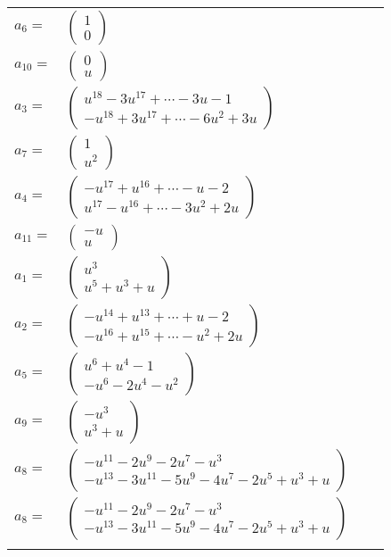 \documentclass[1p]{elsarticle_modified}
\theoremstyle{definition}
\begin{document}
\begin{tabular}{m{7pt} m{180pt} m{7pt} m{180pt} }
\flushright $a_{6}=$&$\begin{pmatrix}1\\0\end{pmatrix}$ \\
\flushright $a_{10}=$&$\begin{pmatrix}0\\u\end{pmatrix}$ \\
\flushright $a_{3}=$&$\begin{pmatrix}u^{18}-3 u^{17}+\cdots-3 u-1\\- u^{18}+3 u^{17}+\cdots-6 u^2+3 u\end{pmatrix}$ \\
\flushright $a_{7}=$&$\begin{pmatrix}1\\u^2\end{pmatrix}$ \\
\flushright $a_{4}=$&$\begin{pmatrix}- u^{17}+u^{16}+\cdots- u-2\\u^{17}- u^{16}+\cdots-3 u^2+2 u\end{pmatrix}$ \\
\flushright $a_{11}=$&$\begin{pmatrix}- u\\u\end{pmatrix}$ \\
\flushright $a_{1}=$&$\begin{pmatrix}u^3\\u^5+u^3+u\end{pmatrix}$ \\
\flushright $a_{2}=$&$\begin{pmatrix}- u^{14}+u^{13}+\cdots+u-2\\- u^{16}+u^{15}+\cdots- u^2+2 u\end{pmatrix}$ \\
\flushright $a_{5}=$&$\begin{pmatrix}u^6+u^4-1\\- u^6-2 u^4- u^2\end{pmatrix}$ \\
\flushright $a_{9}=$&$\begin{pmatrix}- u^3\\u^3+u\end{pmatrix}$ \\
\flushright $a_{8}=$&$\begin{pmatrix}- u^{11}-2 u^9-2 u^7- u^3\\- u^{13}-3 u^{11}-5 u^9-4 u^7-2 u^5+u^3+u\end{pmatrix}$\\ \flushright $a_{8}=$&$\begin{pmatrix}- u^{11}-2 u^9-2 u^7- u^3\\- u^{13}-3 u^{11}-5 u^9-4 u^7-2 u^5+u^3+u\end{pmatrix}$\\&\end{tabular}
\end{document}
